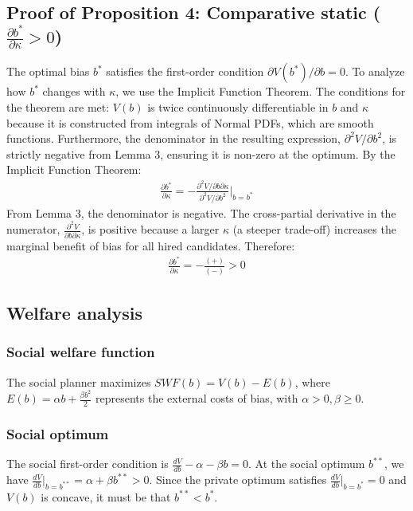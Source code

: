 \subsection{Proof of Proposition 4: Comparative static ($\frac{\partial b^*}{\partial \kappa} > 0$)}

The optimal bias $b^*$ satisfies the first-order condition $\partial V(b^*)/\partial b = 0$. To analyze how $b^*$ changes with $\kappa$, we use the Implicit Function Theorem. The conditions for the theorem are met: $V(b)$ is twice continuously differentiable in $b$ and $\kappa$ because it is constructed from integrals of Normal PDFs, which are smooth functions. Furthermore, the denominator in the resulting expression, $\partial^2 V / \partial b^2$, is strictly negative from Lemma 3, ensuring it is non-zero at the optimum. By the Implicit Function Theorem:
\begin{align}
\frac{\partial b^*}{\partial \kappa} = -\frac{\partial^2 V / \partial b \partial \kappa}{\partial^2 V / \partial b^2}\bigg|_{b=b^*}
\end{align}
From Lemma 3, the denominator is negative. The cross-partial derivative in the numerator, $\frac{\partial^2 V}{\partial b \partial \kappa}$, is positive because a larger $\kappa$ (a steeper trade-off) increases the marginal benefit of bias for all hired candidates. Therefore:
\begin{align}
\frac{\partial b^*}{\partial \kappa} = -\frac{(+)}{(-)} > 0
\end{align}

\subsection{Welfare analysis}

\subsubsection{Social welfare function}
The social planner maximizes $SWF(b) = V(b) - E(b)$, where $E(b) = \alpha b + \frac{\beta b^2}{2}$ represents the external costs of bias, with $\alpha > 0, \beta \ge 0$.

\subsubsection{Social optimum}
The social first-order condition is $\frac{dV}{db} - \alpha - \beta b = 0$. At the social optimum $b^{**}$, we have $\frac{dV}{db}\big|_{b=b^{**}} = \alpha + \beta b^{**} > 0$. Since the private optimum satisfies $\frac{dV}{db}\big|_{b=b^*} = 0$ and $V(b)$ is concave, it must be that $b^{**} < b^*$.

